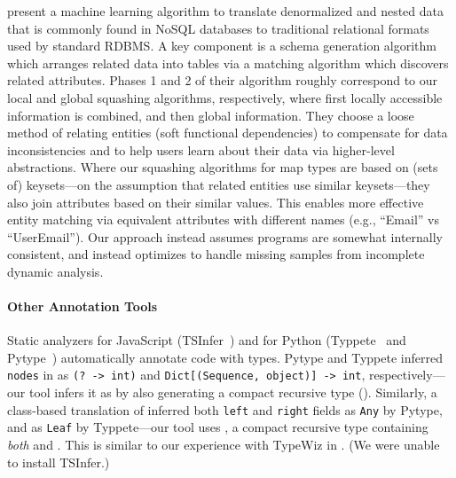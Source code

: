 present a machine learning algorithm to translate denormalized
and nested data that is commonly found in NoSQL databases to traditional
relational formats used by standard RDBMS.
A key component is a schema generation algorithm which arranges related
data into tables via a matching algorithm which discovers related attributes.
Phases 1 and 2 of their algorithm roughly correspond to our local and global
squashing algorithms, respectively, where first locally accessible information
is combined, and then global information.
They choose a loose method of relating entities (soft functional dependencies) to compensate
for data inconsistencies and to help users learn about their data via higher-level abstractions.
Where our squashing algorithms for map types are based on (sets of) keysets---on the 
assumption that related entities use similar keysets---they also join attributes
based on their similar values.
This enables more effective entity matching via equivalent attributes
with different names (e.g., ``Email'' vs ``UserEmail'').
Our approach instead assumes programs are somewhat internally consistent, and instead
optimizes to handle missing samples from incomplete dynamic analysis.

\paragraph{Other Annotation Tools}
Static analyzers
for JavaScript
(TSInfer~) and for Python (Typpete~
and Pytype~)
automatically annotate code with types.
Pytype and Typpete inferred \texttt{nodes} in 
as \texttt{(? -> int)}
and \texttt{Dict[(Sequence, object)] -> int}, respectively---our tool 
infers it as \clj{[Op -> Int]} by also generating a compact recursive
type ().
Similarly, a class-based translation of 
inferred both \texttt{left} and \texttt{right}
fields
as \texttt{Any} by Pytype, and as \texttt{Leaf} by Typpete---our tool
uses ,
a compact recursive type containing \emph{both}  and .
This is similar to our experience with TypeWiz in .
(We were unable to install TSInfer.)

